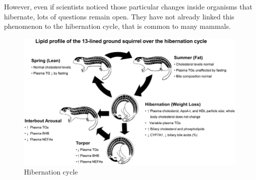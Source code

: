 \documentclass[draft, final]{report}
\begin{document}
\clearpage
However, even if scientists noticed those particular changes inside organisms that hibernate, lots of questions remain open. They have not already linked this phenomenon to the hibernation cycle, that is common to many mammals.
\newline
\newline
\newline
\begin{figure}[!ht]
  \centering
  \includegraphics[scale=3]{LateX/Images/hibernationcycle.png}
  \caption{Hibernation cycle\cite{hibernationcycle}}
\end{figure}

\clearpage
\end{document}
